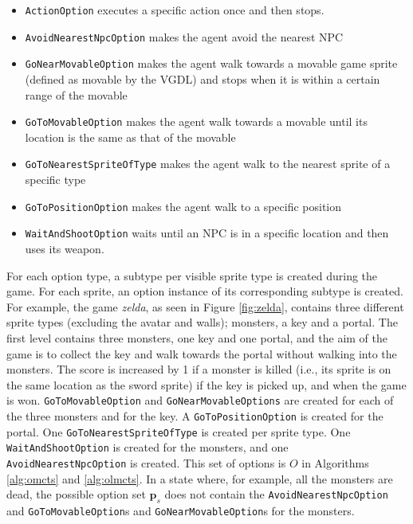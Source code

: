 \begin{itemize}[noitemsep]
	\item \texttt{ActionOption} executes a specific action once and then
		stops.
	\item \texttt{AvoidNearestNpcOption} makes the agent avoid the nearest NPC
	\item \texttt{GoNearMovableOption} makes the agent walk towards a
		movable game sprite (defined as movable by the VGDL) and stops when it
		is within a certain range of the movable
	\item \texttt{GoToMovableOption} makes the agent walk towards a
		movable until its location is the same as that of the movable
	\item \texttt{GoToNearestSpriteOfType} makes the agent walk to the nearest sprite of
		a specific type
	\item \texttt{GoToPositionOption} makes the agent walk to a specific position
	\item \texttt{WaitAndShootOption} waits until an NPC is in a specific location and
		then uses its weapon.
\end{itemize}

For each option type, a subtype per visible sprite type is created during the
game. For each sprite, an option instance of its corresponding subtype is
created. For example, the game \textit{zelda}, as seen in Figure \ref{fig:zelda},
contains three different sprite types (excluding the avatar and walls);
monsters, a key and a portal. The first level contains three monsters, one key
and one portal, and the aim of the game is to collect the key and walk towards
the portal without walking into the monsters. The score is increased by 1 if a
monster is killed (i.e., its sprite is on the same location as the sword sprite)
if the key is picked up, and when the game is won. \texttt{GoToMovableOption} and
\texttt{GoNearMovableOptions} are created for each of the three monsters and
for the key. A \texttt{GoToPositionOption} is created for the portal.  One
\texttt{GoToNearestSpriteOfType} is created per sprite type. One
\texttt{WaitAndShootOption} is created for the monsters, and one
\texttt{AvoidNearestNpcOption} is created. This set of options is $O$ in
Algorithms \ref{alg:omcts} and \ref{alg:olmcts}. In a state where, for example,
all the monsters are dead, the possible option set $\mathbf{p}_s$ does not
contain the \texttt{AvoidNearestNpcOption} and \texttt{GoToMovableOption}s and
\texttt{GoNearMovableOption}s for the monsters.

